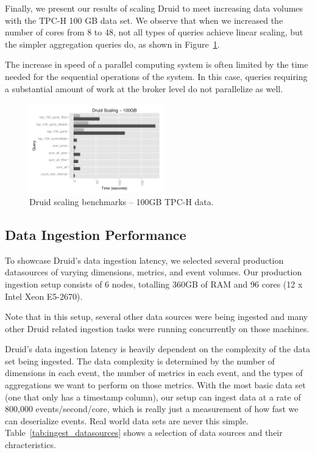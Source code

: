 \documentclass{acm_proc_article-sp}
\begin{document}
Finally, we present our results of scaling Druid to meet increasing data
volumes with the TPC-H 100 GB data set. We observe that when we
increased the number of cores from 8 to 48, not all types of queries
achieve linear scaling, but the simpler aggregation queries do,
as shown in Figure~\ref{fig:tpch_scaling}.

The increase in speed of a parallel computing system is often limited by the
time needed for the sequential operations of the system. In this case, queries
requiring a substantial amount of work at the broker level do not parallelize as
well.

\begin{figure}
\centering
\includegraphics[width = 2.3in]{tpch_scaling}
\caption{Druid scaling benchmarks -- 100GB TPC-H data.}
\label{fig:tpch_scaling}
\end{figure}

\subsection{Data Ingestion Performance}
To showcase Druid's data ingestion latency, we selected several production
datasources of varying dimensions, metrics, and event volumes. Our production
ingestion setup consists of 6 nodes, totalling 360GB of RAM and 96 cores
(12 x Intel Xeon E5-2670).

Note that in this setup, several other data sources were being ingested and
many other Druid related ingestion tasks were running concurrently on those machines.

Druid's data ingestion latency is heavily dependent on the complexity of the
data set being ingested. The data complexity is determined by the number of
dimensions in each event, the number of metrics in each event, and the types of
aggregations we want to perform on those metrics. With the most basic data set
(one that only has a timestamp column), our setup can ingest data at a rate of
800,000 events/second/core, which is really just a measurement of how fast we can
deserialize events. Real world data sets are never this simple.
Table~\ref{tab:ingest_datasources} shows a selection of data sources and their
chracteristics. 
\end{document}
